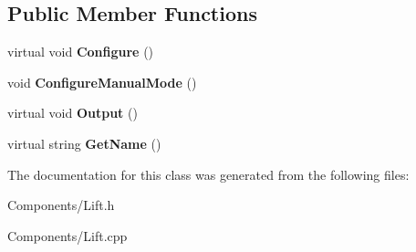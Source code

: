 \subsection*{\-Public \-Member \-Functions}
\begin{DoxyCompactItemize}
\item 
\hypertarget{class_lift_a1d23cf42b381bb1eab60ed061f1ad8e6}{
virtual void {\bfseries \-Configure} ()}
\label{class_lift_a1d23cf42b381bb1eab60ed061f1ad8e6}

\item 
\hypertarget{class_lift_a70984975c8cbcdce79eade3bc6e92d8f}{
void {\bfseries \-Configure\-Manual\-Mode} ()}
\label{class_lift_a70984975c8cbcdce79eade3bc6e92d8f}

\item 
\hypertarget{class_lift_a290f03327cc1a9767226d15b977d2bd4}{
virtual void {\bfseries \-Output} ()}
\label{class_lift_a290f03327cc1a9767226d15b977d2bd4}

\item 
\hypertarget{class_lift_ad53c2e6e4b2e9f70cdc8833d21191f96}{
virtual string {\bfseries \-Get\-Name} ()}
\label{class_lift_ad53c2e6e4b2e9f70cdc8833d21191f96}

\end{DoxyCompactItemize}


\-The documentation for this class was generated from the following files\-:\begin{DoxyCompactItemize}
\item 
\-Components/\-Lift.\-h\item 
\-Components/\-Lift.\-cpp\end{DoxyCompactItemize}
